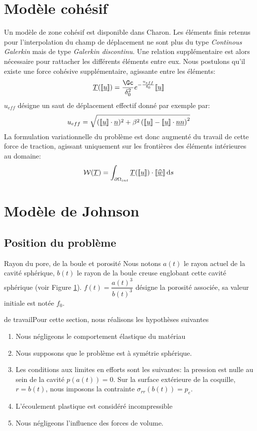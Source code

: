 \documentclass[10pt]{book}
\begin{document}
\section{Modèle cohésif}\label{Section:Modèle cohésif}
Un modèle de zone cohésif est disponible dans Charon. Les éléments finis retenus pour l'interpolation du champ de déplacement ne sont plus du type \emph{Continous Galerkin} mais de type \emph{Galerkin discontinu}. Une relation supplémentaire est alors nécessaire pour rattacher les différents éléments entre eux. Nous postulons qu'il existe une force cohésive supplémentaire, agissante entre les éléments:
$$\vec{T}(\jump{\Dep})=\dfrac{\Gc}{\delta_{0}^{2}}e^{-\frac{u_{eff}}{\delta_{0}}}\jump{\Dep}$$
$u_{eff}$ désigne un saut de déplacement effectif donné par exemple par:
$$u_{eff}=\sqrt{(\lbrack\!\lbrack \underline{u} \rbrack\!\rbrack\cdot\underline{n})^{2}+\beta^{2}\left(\lbrack\!\lbrack \underline{u} \rbrack\!\rbrack-\lbrack\!\lbrack \underline{u} \rbrack\!\rbrack\cdot\underline{n}\underline{n}\right)^{2}}$$
La formulation variationnelle du problème est donc augmenté du travail de cette force de traction, agissant uniquement sur les frontières des éléments intérieures au domaine:
$$\mathcal{W}(\underline{T})=\int_{\partial\Omega_{int}}\underline{T}(\lbrack\!\lbrack \underline{u} \rbrack\!\rbrack)\cdot\lbrack\!\lbrack \widehat{\underline{w}} \rbrack\!\rbrack\,\mathrm{d}s$$

\section{Modèle de Johnson}
\subsection{Position du problème}
\begin{Not}{Rayon du pore, de la boule et porosité} Nous notons $a(t)$ le rayon actuel de la cavité sphérique, $b(t)$ le rayon de la boule creuse englobant cette cavité sphérique (voir Figure \ref{pore_unique}). $\displaystyle f(t)=\dfrac{a(t)^3}{b(t)^3}$ désigne la porosité associée, sa valeur initiale est notée $f_0$.
 \end{Not}
\begin{Hypothese}{ de travail}Pour cette section, nous réalisons les hypothèses suivantes
\begin{enumerate}
\item Nous négligeons le comportement élastique du matériau
\item Nous supposons que le problème est à symétrie sphérique.
\item Les conditions aux limites en efforts sont les suivantes: la pression est nulle au sein de la cavité $p(a(t))=0$. Sur la surface extérieure de la coquille, $r=b(t)$, nous imposons la contrainte $\sigma_{rr}(b(t)) =p_e$.
\item\label{hyp4:incompressible} L'écoulement plastique est considéré incompressible
\item Nous négligeons l'influence des forces de volume.
\end{enumerate}
\end{Hypothese}
\begin{figure}[h!]
\label{pore_unique}
\end{figure}
\end{document}
